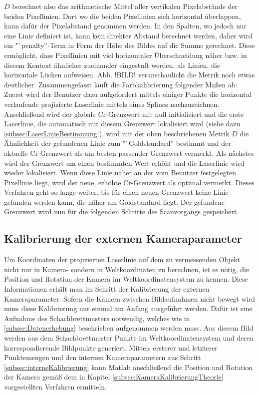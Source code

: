 \(D\) berechnet also das arithmetische Mittel aller vertikalen Pixelabstände der beiden Pixellinien. Dort wo die beiden Pixellinien sich horizontal überlappen, kann dafür der Pixelabstand genommen werden. In den Spalten, wo jedoch nur eine Linie definiert ist, kann kein direkter Abstand berechnet werden, daher wird ein "`penalty''-Term in Form der Höhe des Bildes auf die Summe gerechnet. Diese ermöglicht, dass Pixellinien mit viel horizontaler Überschneidung näher bzw. in diesem Kontext ähnlicher zueinander eingestuft werden, als Linien, die horizontale Lücken aufweisen. Abb. !BILD! veranschaulicht die Metrik noch etwas deutlicher. \bigbreak
Zusammengefasst läuft die Farbkalibrierung folgender Maßen ab: Zuerst wird der Benutzer dazu aufgefordert mittels einiger Punkte die horizontal verlaufende projizierte Laserlinie mittels eines Splines nachzuzeichnen. Anschließend wird der globale Cr-Grenzwert mit null initialisiert und die erste Laserlinie, die automatisch mit diesem Grenzwert lokalisiert wird (siehe dazu \ref{subsec:LaserLinieBestimmung}), wird mit der oben beschriebenen Metrik \(D\) die Ähnlichkeit der gefundenen Linie zum "`Goldstandard'' bestimmt und der aktuelle Cr-Grenzwert als am besten passender Grenzwert vermerkt. Als nächstes wird der Grenzwert um einen bestimmten Wert erhöht und die Laserlinie wird wieder lokalisiert. Wenn diese Linie näher an der vom Benutzer festgelegten Pixellinie liegt, wird der neue, erhöhte Cr-Grenzwert als optimal vermerkt. Dieses Verfahren geht so lange weiter, bis für einen neuen Grenzwert keine Linie gefunden werden kann, die näher am Goldstandard liegt. Der gefundene Grenzwert wird nun für die folgenden Schritte des Scanvorgangs gespeichert.


\subsection{Kalibrierung der externen Kameraparameter}
\label{subsec:externeKalibrierung}
Um Koordinaten der projizierten Laserlinie auf dem zu vermessenden Objekt nicht nur in Kamera- sondern in Weltkoordinaten zu berechnen, ist es nötig, die Position und Rotation der Kamera im Weltkoordinatensystem zu kennen. Diese Informationen erhält man im Schritt der Kalibrierung der externen Kameraparameter. Sofern die Kamera zwischen Bildaufnahmen nicht bewegt wird muss diese Kalibrierung nur einmal am Anfang ausgeführt werden. Dafür ist eine Aufnahme des Schachbrettmusters notwendig, welches wie in \ref{subsec:Datenerhebung} beschrieben aufgenommen werden muss. Aus diesem Bild werden aus dem Schachbrettmuster Punkte im Weltkoordinatensystem und deren korrespondierende Bildpunkte generiert. Mittels ersterer und letzterer Punktemengen und den internen Kameraparametern aus Schritt \ref{subsec:interneKalibrierung} kann Matlab anschließend die Position und Rotation der Kamera gemäß dem in Kapitel \ref{subsec:KameraKalibrierungTheorie} vorgestellten Verfahren ermitteln.

